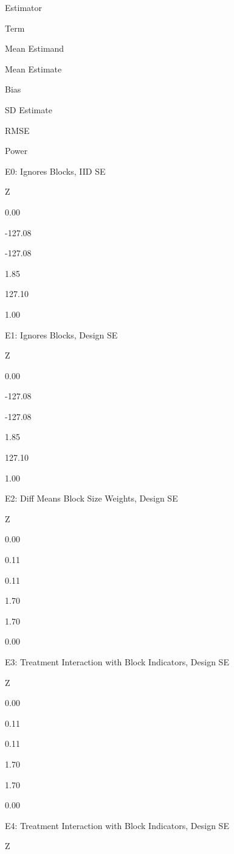 \documentclass[
  12pt,
]{book}
\newenvironment{Shaded}{\begin{snugshade}}{\end{snugshade}}
\newcommand{\CommentTok}[1]{\textcolor[rgb]{0.56,0.35,0.01}{\textit{#1}}}
\newcommand{\KeywordTok}[1]{\textcolor[rgb]{0.13,0.29,0.53}{\textbf{#1}}}
\newcommand{\NormalTok}[1]{#1}
\theoremstyle{definition}
\theoremstyle{definition}
\theoremstyle{definition}
\theoremstyle{remark}
\begin{document}
\begin{Shaded}
\end{Shaded}

Estimator

Term

Mean Estimand

Mean Estimate

Bias

SD Estimate

RMSE

Power

E0: Ignores Blocks, IID SE

Z

0.00

-127.08

-127.08

1.85

127.10

1.00

E1: Ignores Blocks, Design SE

Z

0.00

-127.08

-127.08

1.85

127.10

1.00

E2: Diff Means Block Size Weights, Design SE

Z

0.00

0.11

0.11

1.70

1.70

0.00

E3: Treatment Interaction with Block Indicators, Design SE

Z

0.00

0.11

0.11

1.70

1.70

0.00

E4: Treatment Interaction with Block Indicators, Design SE

Z
\end{document}
